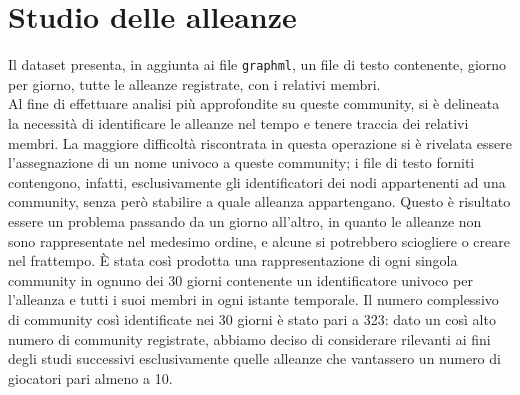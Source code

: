 \section{Studio delle alleanze}
Il dataset presenta, in aggiunta ai file \texttt{graphml}, un file di testo contenente, giorno per giorno, tutte le alleanze registrate, con i relativi membri.\\
Al fine di effettuare analisi più approfondite su queste community, si è delineata la necessità di identificare le alleanze nel tempo e tenere traccia dei relativi membri.
La maggiore difficoltà riscontrata in questa operazione si è rivelata essere l'assegnazione di un nome univoco a queste community; i file di testo forniti contengono, infatti, esclusivamente gli identificatori dei nodi appartenenti ad una community, senza però stabilire a quale alleanza appartengano.
Questo è risultato essere un problema passando da un giorno all'altro, in quanto le alleanze non sono rappresentate nel medesimo ordine, e alcune si potrebbero sciogliere o creare nel frattempo.
È stata così prodotta una rappresentazione di ogni singola community in ognuno dei 30 giorni contenente un identificatore univoco per l'alleanza e tutti i suoi membri in ogni istante temporale. Il numero complessivo di community così identificate nei 30 giorni è stato pari a 323: dato un così alto numero di community registrate, abbiamo deciso di considerare rilevanti ai fini degli studi successivi esclusivamente quelle alleanze che vantassero un numero di giocatori pari almeno a 10.

